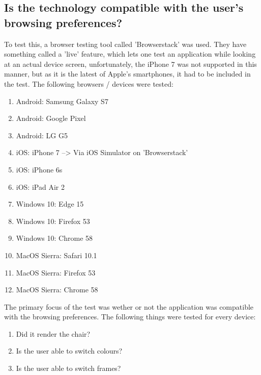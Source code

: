 \subsection{Is the technology compatible with the user's browsing preferences?}
To test this, a browser testing tool called 'Browserstack' was used. They have something called a 'live' feature, which lets one test an application while looking at an actual device screen, unfortunately, the iPhone 7 was not supported in this manner, but as it is the latest of Apple's smartphones, it had to be included in the test. The following browsers / devices were tested:
​\begin{enumerate}
\item {Android: Samsung Galaxy S7}
\item {Android: Google Pixel}
\item {Android: LG G5}
\item {iOS: iPhone 7 --> Via iOS Simulator on 'Browserstack'}
\item {iOS: iPhone 6s}
\item {iOS: iPad Air 2}
\item {Windows 10: Edge 15}
\item {Windows 10: Firefox 53}
\item {Windows 10: Chrome 58}
\item {MacOS Sierra: Safari 10.1}
\item {MacOS Sierra: Firefox 53}
\item {MacOS Sierra: Chrome 58}
\end{enumerate}

The primary focus of the test was wether or not the application was compatible with the browsing preferences. The following things were tested for every device:
​\begin{enumerate}
\item {Did it render the chair?}
\item {Is the user able to switch colours?}
\item {Is the user able to switch frames?}
\end{enumerate}
